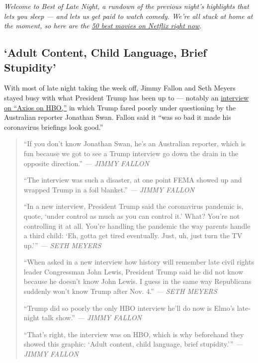 \emph{Welcome to Best of Late Night, a rundown of the previous night's
highlights that lets you sleep --- and lets us get paid to watch comedy.
We're all stuck at home at the moment, so here are the}
\href{https://www.nytimes.com/interactive/2020/arts/television/best-movies-on-netflix.html}{\emph{50
best movies on Netflix right now}}\emph{.}

\hypertarget{adult-content-child-language-brief-stupidity}{%
\subsection{`Adult Content, Child Language, Brief
Stupidity'}\label{adult-content-child-language-brief-stupidity}}

With most of late night taking the week off, Jimmy Fallon and Seth
Meyers stayed busy with what President Trump has been up to --- notably
an
\href{https://www.nytimes.com/2020/08/04/us/politics/trump-john-lewis-axios.html}{interview
on ``Axios on HBO,''} in which Trump fared poorly under questioning by
the Australian reporter Jonathan Swan. Fallon said it ``was so bad it
made his coronavirus briefings look good.''

\begin{quote}
``If you don't know Jonathan Swan, he's an Australian reporter, which is
fun because we got to see a Trump interview go down the drain in the
opposite direction.'' \emph{--- JIMMY FALLON}

``The interview was such a disaster, at one point FEMA showed up and
wrapped Trump in a foil blanket.'' \emph{--- JIMMY FALLON}

``In a new interview, President Trump said the coronavirus pandemic is,
quote, `under control as much as you can control it.' What? You're not
controlling it at all. You're handling the pandemic the way parents
handle a third child: `Eh, gotta get tired eventually. Just, uh, just
turn the TV up.''' \emph{--- SETH MEYERS}

``When asked in a new interview how history will remember late civil
rights leader Congressman John Lewis, President Trump said he did not
know because he doesn't know John Lewis. I guess in the same way
Republicans suddenly won't know Trump after Nov. 4.'' \emph{--- SETH
MEYERS}

``Trump did so poorly the only HBO interview he'll do now is Elmo's
late-night talk show.'' \emph{--- JIMMY FALLON}

``That's right, the interview was on HBO, which is why beforehand they
showed this graphic: `Adult content, child language, brief stupidity.'''
\emph{--- JIMMY FALLON}
\end{quote}

